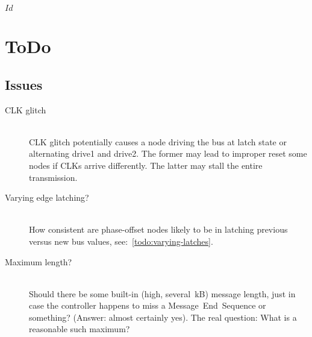 \svnInfo $Id$

\section{ToDo}
\label{sec:todo}
\subsection{Issues}
\begin{description}
	\item[CLK glitch] \hfil \\
	CLK glitch potentially causes a node driving the bus at {\sc latch state} or
	alternating {\sc drive1} and {\sc drive2}. The former may lead to improper
	reset some nodes if CLKs arrive differently. The latter may stall the entire
	transmission.

  \item[Varying edge latching?] \hfil \\
  How consistent are phase-offset nodes likely to be in latching previous
  versus new bus values, see:~\ref{todo:varying-latches}.

  \item[Maximum length?] \hfil \\
  Should there be some built-in (high, several~kB) message length, just in
  case the controller happens to miss a Message~End~Sequence or something?
  (Answer: almost certainly yes). The real question: What is a reasonable such
  maximum?
\end{description}
